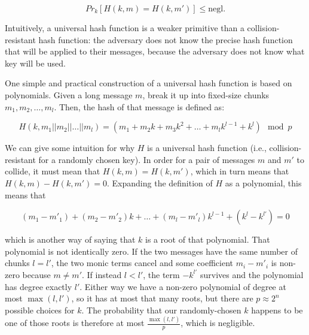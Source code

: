 $$
Pr_k[H(k, m) = H(k, m')] \leq \text{negl.}
$$

Intuitively, a universal hash function is a weaker primitive than a
collision-resistant hash function: the adversary does not know the
precise hash function that will be applied to their messages, because
the adversary does not know what key will be used.

One simple and practical construction of a universal hash function
is based on polynomials.  Given a long message $m$, break it up into
fixed-size chunks $m_1, m_2, \ldots, m_{l}$.  Then,
the hash of that message is defined as:

$$
H(k, m_1 || m_2 || \ldots || m_{l}) = (m_1 + m_2 k + m_3 k^2 +
  \ldots + m_{l} k^{l-1} + k^{l}) \mod p
$$


We can give some intuition for why $H$ is a universal hash function
(i.e., collision-resistant for a randomly chosen key).  In order for
a pair of messages $m$ and $m'$ to collide, it must mean that
$H(k, m) = H(k, m')$, which in turn means that $H(k, m) - H(k, m') = 0$.
Expanding the definition of $H$ as a polynomial, this means that

$$
(m_1 - m'_1) + (m_2 - m'_2) k + \ldots + (m_{l} - m'_{l}) k^{l-1}
  + (k^{l} - k^{l'}) = 0
$$

which is another way of saying that $k$ is a root of that polynomial.
That polynomial is not identically zero.  If the two messages have the
same number of chunks $l = l'$, the two monic terms cancel and some
coefficient $m_i - m'_i$ is non-zero because $m \neq m'$.  If instead
$l < l'$, the term $-k^{l'}$ survives and the polynomial has degree
exactly $l'$.  Either way we have a non-zero polynomial of degree at
most $\max(l, l')$, so it has at most that many roots, but there are
$p \approx 2^n$ possible choices for $k$.  The probability that our
randomly-chosen $k$ happens to be one of those roots is therefore at
most $\frac{\max(l,l')}{p}$, which is negligible.

